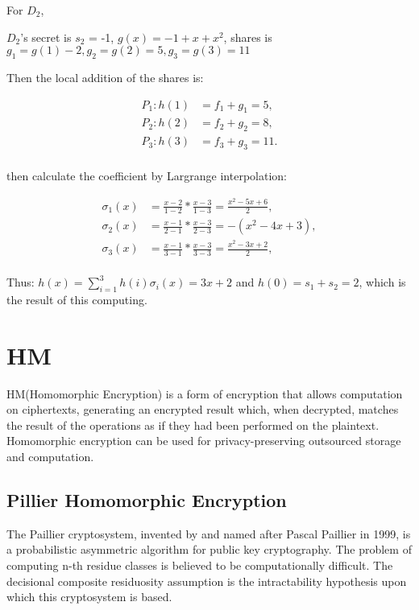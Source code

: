 \documentclass[a4paper,11pt]{article}
\begin{document}
For $D_2$,

$D_{2}$'s  secret is $s_2$ = -1, $g(x) = -1 + x + x^2$, shares is $g_1 = g(1) - 2, g_2 = g(2) = 5, g_3 = g(3) = 11$


Then the local addition of the shares is:

\begin{equation}
\begin{split}
P_1 : h(1) &= f_1 + g_1 = 5,    \\
P_2 : h(2) &= f_2 + g_2 = 8,    \\
P_3 : h(3) &= f_3 + g_3 = 11. \\
\end{split}
\end{equation}

then calculate the coefficient by Largrange interpolation:

\begin{equation}
\begin{split}
\sigma_{1}(x) &= \frac{x - 2}{1 - 2} * \frac{x - 3}{1-3} = \frac{x^2 - 5x + 6}{2},  \\
\sigma_{2}(x) &= \frac{x - 1}{2 - 1} * \frac{x - 3}{2-3} = -(x^2 - 4x + 3),  \\
\sigma_{3}(x) &= \frac{x - 1}{3 - 1} * \frac{x - 3}{3-3} = \frac{x^2 - 3x + 2}{2},  \\
\end{split}
\end{equation}

Thus: $ h(x) = \sum_{i=1}^{3}h(i)\sigma_{i}(x) = 3x + 2$ and  $h(0) = s_1 + s_2 = 2$, which is the result of this computing.
 
\section{HM}

HM(Homomorphic Encryption) is a form of encryption that allows computation on ciphertexts, generating an encrypted result which, when decrypted, matches the result of the operations as if they had been performed on the plaintext. Homomorphic encryption can be used for privacy-preserving outsourced storage and computation. 

\subsection{Pillier Homomorphic Encryption}

The Paillier cryptosystem, invented by and named after Pascal Paillier in 1999, is a probabilistic asymmetric algorithm for public key cryptography. The problem of computing n-th residue classes is believed to be computationally difficult. The decisional composite residuosity assumption is the intractability hypothesis upon which this cryptosystem is based.
\end{document}
